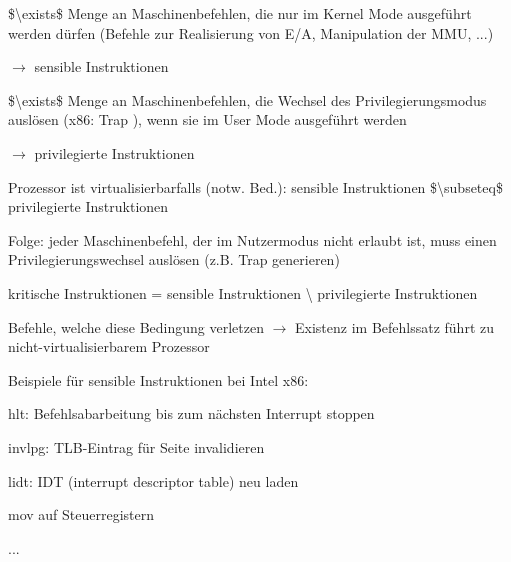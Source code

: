 \documentclass[a4paper]{article}
\begin{document}
\begin{multicols}{3}
    \begin{itemize*}
        \item
        \$\textbackslash exists\$ Menge an Maschinenbefehlen, die nur im
        Kernel Mode ausgeführt werden dürfen (Befehle zur Realisierung von
        E/A, Manipulation der MMU, ...)
        \begin{itemize*}
            \item $\rightarrow$ sensible Instruktionen
        \end{itemize*}
        \item
        \$\textbackslash exists\$ Menge an Maschinenbefehlen, die Wechsel des
        Privilegierungsmodus auslösen (x86: Trap ), wenn sie im User Mode
        ausgeführt werden
        \begin{itemize*}
            \item $\rightarrow$ privilegierte Instruktionen
        \end{itemize*}
        \item
        Prozessor ist virtualisierbarfalls (notw. Bed.): sensible
        Instruktionen \$\textbackslash subseteq\$ privilegierte Instruktionen
        \item
        Folge: jeder Maschinenbefehl, der im Nutzermodus nicht erlaubt ist,
        muss einen Privilegierungswechsel auslösen (z.B. Trap generieren)
        \item
        kritische Instruktionen = sensible Instruktionen \textbackslash{}
        privilegierte Instruktionen
        \begin{itemize*}
            \item Befehle, welche diese Bedingung verletzen $\rightarrow$ Existenz im Befehlssatz führt zu nicht-virtualisierbarem Prozessor
        \end{itemize*}
        \item
        Beispiele für sensible Instruktionen bei Intel x86:
        \begin{itemize*}
            \item hlt: Befehlsabarbeitung bis zum nächsten Interrupt stoppen
            \item invlpg: TLB-Eintrag für Seite invalidieren
            \item lidt: IDT (interrupt descriptor table) neu laden
            \item mov auf Steuerregistern
            \item ...
        \end{itemize*}
        \item

\end{itemize*}
\end{multicols}
\end{document}
